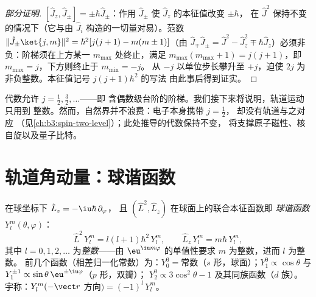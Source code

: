 \begin{proof}[部分证明]
$[\hat J_z, \hat J_\pm] = \pm\hbar\hat J_\pm$：作用 $\hat
J_\pm$ 使 $\hat J_z$ 的本征值改变 $\pm\hbar$，
在 $\hat J^2$ 保持不变的情况下（它与由 $\hat
J_i$ 构造的一切量对易）。范数 $\|\hat J_\pm\ket{j,m}\|^2 = \hbar^2[j(j+1) -
m(m\pm1)]$（由 $\hat J_\mp\hat J_\pm = \hat J^2 - \hat
J_z^2 \mp \hbar\hat J_z$）必须非负：阶梯须在上方某一
$m_{\max}$ 处终止，满足 $m_{\max}(m_{\max}+1) =
j(j+1)$，即 $m_{\max} = j$，下方则终止于 $m_{\min} = -j$。
从 $-j$ 以单位步长攀升至 $+j$，迫使 $2j$
为非负整数。本征值记号 $j(j+1)\hbar^2$ 的写法
由此事后得到证实。
\end{proof}

\begin{remark}[目录中的空位]\label{rem:b3:quantum-angular-momentum:halfinteger}
代数允许 $j = \tfrac12, \tfrac32, \dots$——即
含偶数级台阶的阶梯。我们接下来将说明，轨道运动只用到
整数。然而，自然界并不浪费：电子本身携带 $j = \tfrac12$，
却没有轨道与之对应
（见\cref{ch:b3:spin-two-level}）；此处推导的代数保持不变，
将支撑原子磁性、核自旋以及量子比特。
\end{remark}

\section{轨道角动量：球谐函数}

\begin{proposition}[球谐函数]\label{prop:b3:quantum-angular-momentum:harmonics}
在球坐标下 $\hat L_z = -\iu\hbar\,\partial_\varphi$，
且 $(\hat L^2, \hat L_z)$ 在球面上的联合本征函数即
\emph{球谐函数} $Y_l^m(\theta, \varphi)$：
\[
\hat L^2\,Y_l^m = l(l+1)\hbar^2\,Y_l^m , \qquad
\hat L_z\,Y_l^m = m\hbar\,Y_l^m ,
\]
其中 $l = 0, 1, 2, \dots$ 为\emph{整数}——由
$\eu^{\iu m\varphi}$ 的单值性要求 $m$ 为整数，进而 $l$ 为整数。
前几个函数（相差归一化常数）为：$Y_0^0 = \text{常数}$（$s$
形，球面）；$Y_1^0 \propto \cos\theta$ 与 $Y_1^{\pm1}
\propto \sin\theta\,\eu^{\pm\iu\varphi}$（$p$ 形，双瓣）；
$Y_2^0 \propto 3\cos^2\theta - 1$ 及其同族函数（$d$ 族）。
宇称：$Y_l^m(-\vect r$ 方向$) = (-1)^l\,Y_l^m$。
\end{proposition}
\admitted

